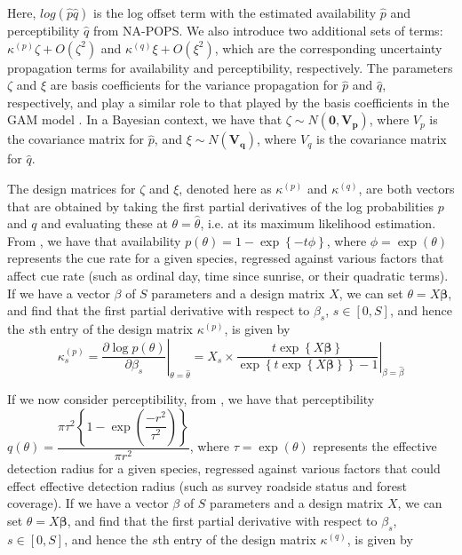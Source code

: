 \documentclass[12pt]{article}
\begin{document}
\par Here, $log(\hat{p} \hat{q})$ is the log offset term with the estimated availability $\hat{p}$ and perceptibility $\hat{q}$ from NA-POPS. 
We also introduce two additional sets of terms: $\kappa^{(p)}\zeta + O(\zeta^2)$ and $\kappa^{(q)}\xi + O(\xi^2)$, which are the corresponding uncertainty propagation terms for availability and perceptibility, respectively.  
The parameters $\zeta$ and $\xi$ are basis coefficients for the variance propagation for $\hat{p}$ and $\hat{q}$, respectively, and play a similar role to that played by the basis coefficients in the GAM model \citep{bravington_variance_2021}. 
In a Bayesian context, we have that $\zeta \sim N(\boldsymbol{0}, \boldsymbol{V_p})$, where $V_p$ is the covariance matrix for $\hat{p}$, and $\xi \sim N(\boldsymbol{V_q})$, where $V_q$ is the covariance matrix for $\hat{q}$.

\par The design matrices for $\zeta$ and $\xi$, denoted here as $\kappa^{(p)}$ and $\kappa^{(q)}$, are both vectors that are obtained by taking the first partial derivatives of the log probabilities $p$ and $q$ and evaluating these at $\theta = \hat{\theta}$, i.e. at its maximum likelihood estimation. 
From \citet{solymos_calibrating_2013}, we have that availability $p(\theta) = 1 - \exp\left\{-t\phi\right\}$, where $\phi = \exp\left(\theta\right)$ represents the cue rate for a given species, regressed against various factors that affect cue rate (such as ordinal day, time since sunrise, or their quadratic terms). 
If we have a vector {\boldmath$\beta$} of $S$ parameters and a design matrix $X$, we can set $\theta = X\boldsymbol{\beta}$, and find that the first partial derivative with respect to $\beta_s$, $s \in \left[0, S\right]$, and hence the $s$th entry of the design matrix $\kappa^{(p)}$, is given by
\begin{equation*}\label{kappa_p}
	\kappa_{s}^{(p)} = \left.\dfrac{\partial \log p(\theta)}{\partial \beta_s}\right\vert_{\theta = \hat{\theta}} = \left. X_s \times \dfrac{t \exp\left\{X\boldsymbol{\beta}\right\}}{\exp\left\{t \exp\left\{X\boldsymbol{\beta}\right\}\right\} - 1} \right\vert_{\beta = \hat{\beta}}
\end{equation*}
	
\par If we now consider perceptibility, from \citet{solymos_calibrating_2013}, we have that perceptibility $q(\theta) = \dfrac{\pi \tau^2 \left\{1 - \exp\left(\dfrac{-r^2}{\tau^2}\right)\right\}}{\pi r^2}$, where $\tau = \exp(\theta)$ represents the effective detection radius for a given species, regressed against various factors that could effect effective detection radius (such as survey roadside status and forest coverage). 
If we have a vector {\boldmath$\beta$} of $S$ parameters and a design matrix $X$, we can set $\theta = X\boldsymbol{\beta}$, and find that the first partial derivative with respect to $\beta_s$, $s \in \left[0, S\right]$, and hence the $s$th entry of the design matrix $\kappa^{(q)}$, is given by
\end{document}
